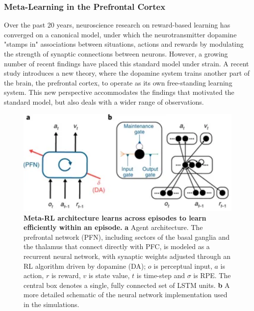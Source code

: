 \documentclass[main]{subfiles}
\begin{document}
\subsubsection{Meta-Learning in the Prefrontal Cortex}
Over the past 20 years, neuroscience research on reward-based learning has converged on a canonical model, under which the neurotransmitter dopamine "stamps in" associations between situations, actions and rewards by modulating the strength of synaptic connections between neurons. However, a growing number of recent findings have placed this standard model under strain. A recent study introduces a new theory, where the dopamine system trains another part of the brain, the prefrontal cortex, to operate as its own free-standing learning system. This new perspective accommodates the findings that motivated the standard model, but also deals with a wider range of observations.
%
\begin{figure}[H]
    \centering
    \includegraphics[width=0.8\linewidth]{14_ContinualMetaAndTransferLearning/figures/metalearning_prefrontalcortex.png}
    \caption{\textbf{Meta-RL architecture learns across episodes to learn efficiently within an episode.} \textbf{a} Agent architecture. The prefrontal network (PFN), including sectors of the basal ganglia and the thalamus that connect directly with PFC, is modeled as a recurrent neural network, with synaptic weights adjusted through an RL algorithm driven by dopamine (DA); $o$ is perceptual input, $a$ is action, $r$ is reward, $v$ is state value, $t$ is time-step and $\sigma $ is RPE. The central box denotes a single, fully connected set of LSTM units. \textbf{b} A more detailed schematic of the neural network implementation used in the simulations.}
    \label{fig:sorn}
\end{figure}
\end{document}
